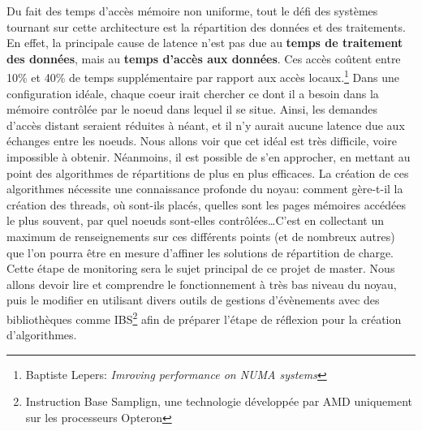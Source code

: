   Du fait des temps d'accès mémoire non uniforme, tout le défi des systèmes
  tournant sur cette architecture est la répartition des données et des
  traitements. En effet, la principale cause de latence n'est pas due au
  \textbf{temps de traitement des données}, mais au \textbf{temps d'accès aux
    données}. Ces accès coûtent entre 10\% et 40\% de temps supplémentaire par
  rapport aux accès locaux.\footnote{Baptiste Lepers: \textit{Imroving
      performance on NUMA systems}} Dans une configuration idéale, chaque coeur
  irait chercher ce dont il a besoin dans la mémoire contrôlée par le noeud dans
  lequel il se situe. Ainsi, les demandes d'accès distant seraient réduites à
  néant, et il n'y aurait aucune latence due aux échanges entre les noeuds. Nous
  allons voir que cet idéal est très difficile, voire impossible à
  obtenir. Néanmoins, il est possible de s'en approcher, en mettant au point des
  algorithmes de répartitions de plus en plus efficaces. La création de ces
  algorithmes nécessite une connaissance profonde du noyau: comment gère-t-il la
  création des threads, où sont-ils placés, quelles sont les pages mémoires
  accédées le plus souvent, par quel noeuds sont-elles contrôlées\ldots C'est en
  collectant un maximum de renseignements sur ces différents points (et de
  nombreux autres) que l'on pourra être en mesure d'affiner les solutions de
  répartition de charge. Cette étape de monitoring sera le sujet principal de ce
  projet de master. Nous allons devoir lire et comprendre le fonctionnement à
  très bas niveau du noyau, puis le modifier en utilisant divers outils de
  gestions d'évènements avec des bibliothèques comme IBS\footnote{Instruction
    Base Samplign, une technologie développée par AMD uniquement sur les
    processeurs Opteron} afin de préparer l'étape de réflexion pour la création
  d'algorithmes.

